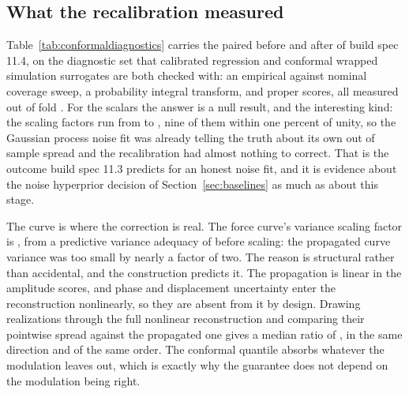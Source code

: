 \documentclass[11pt,a4paper]{article}
\begin{document}
\subsection{What the recalibration measured}
Table~\ref{tab:conformaldiagnostics} carries the paired before and after of build spec 11.4, on
the diagnostic set that calibrated regression and conformal wrapped simulation surrogates are
both checked with: an empirical against nominal coverage sweep, a probability integral
transform, and proper scores, all measured out of fold
\cite{kuleshov2018,gopakumar2026}. For
the scalars the answer is a null result, and the interesting kind: the \ScalarScalingCount{}
scaling factors run from \ScalarScalingMin{} to \ScalarScalingMax{}, nine of them within one
percent of unity, so the Gaussian process noise fit was already telling the truth about its own
out of sample spread and the recalibration had almost nothing to correct. That is the outcome
build spec 11.3 predicts for an honest noise fit, and it is evidence about the noise hyperprior
decision of Section~\ref{sec:baselines} as much as about this stage.

The curve is where the correction is real. The force curve's variance scaling factor is
\BandForceScaling{}, from a predictive variance adequacy of \CurvePvaBefore{} before scaling:
the propagated curve variance was too small by nearly a factor of two. The reason is structural
rather than accidental, and the construction predicts it. The propagation is linear in the
amplitude scores, and phase and displacement uncertainty enter the reconstruction nonlinearly,
so they are absent from it by design. Drawing \ModulationDraws{} realizations through the full
nonlinear reconstruction and comparing their pointwise spread against the propagated one gives a
median ratio of \ModulationRatioMedian{}, in the same direction and of the same order. The
conformal quantile absorbs whatever the modulation leaves out, which is exactly why the
guarantee does not depend on the modulation being right.

\begin{table}[tbp]
\centering
\caption{Paired diagnostics, before and after the measured out of fold variance scaling. PVA is
the predictive variance adequacy defined above, zero when the variance is adequate. CRPS skill
is against a leave one out climatology; NLPD is in nats and carries the target's own units
through the density, so it compares within a row and not across rows.}
\label{tab:conformaldiagnostics}
\footnotesize

\end{table}
\end{document}
